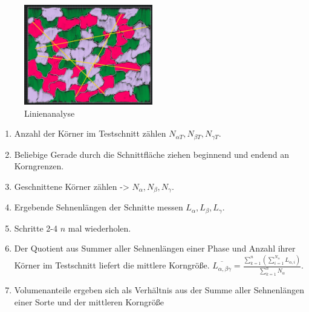 \begin{figure}[h]
    \centering
    \includegraphics[width=0.5\textwidth]{entries/6/linien.jpg}
    \caption{Linienanalyse}
    \label{fig:flaechen}
\end{figure}
\begin{enumerate}
    \item Anzahl der Körner im Testschnitt zählen \(N_{\alpha T}, N_{\beta T}, N_{\gamma T}\).
    \item Beliebige Gerade durch die Schnittfläche
    ziehen beginnend und endend an Korngrenzen.
    \item Geschnittene Körner zählen -> \(N_{\alpha}, N_{\beta}, N_{\gamma}\).
    \item Ergebende Sehnenlängen der Schnitte messen
    \(L_{\alpha}, L_{\beta}, L_{\gamma}\).
    \item Schritte 2-4 \(n\) mal wiederholen.
    \item Der Quotient aus Summer aller Sehnenlängen einer Phase und Anzahl ihrer Körner im
    Testschnitt liefert die mittlere Korngröße. \( \overline{L_{\alpha,\beta\gamma}} = \frac{\sum_{k=1}^{n} ( \sum_{i=1}^{N_{\alpha}} L_{\alpha,i})}{ \sum_{k=1}^{n}N_{\alpha} } \).
    \item Volumenanteile ergeben sich als Verhältnis aus der Summe aller Sehnenlängen einer Sorte und der mittleren Korngröße
\end{enumerate}

